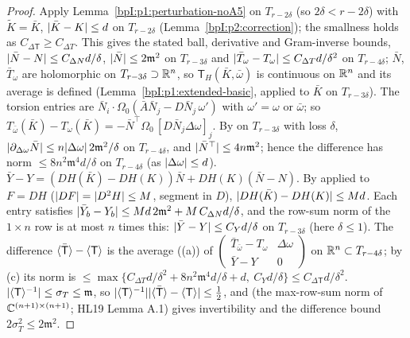 \begin{proof}
\label{stepI:p2:to-frame}
Apply Lemma~\ref{bpI:p1:perturbation-noA5} on $T_{r-2\delta}$ (so $2\delta<r-2\delta$) with $\tilde K=\bar K$, $\lvert \bar K-K\rvert\le d$ on $T_{r-2\delta}$ (Lemma~\ref{bpI:p2:correction}); the smallness holds as $C_{\Delta\mathsf T}\ge C_{\Delta T}$. This gives the stated ball, derivative and Gram-inverse bounds, $\lvert \bar N-N\rvert\le C_{\Delta N}d/\delta$, $\lvert \bar N\rvert\le2\mathfrak m^2$ on $T_{r-3\delta}$ and $\lvert \bar T_\omega-T_\omega\rvert\le C_{\Delta T}d/\delta^2$ on $T_{r-4\delta}$; $\bar N$, $\bar T_\omega$ are holomorphic on $T_{r-3\delta}\supset\mathbb{R}^n$, so $\mathsf T_H(\bar K,\bar\omega)$ is continuous on $\mathbb{R}^n$ and its average is defined (Lemma~\ref{bpI:p1:extended-basic}, applied to $\bar K$ on $T_{r-3\delta}$).
\label{stepI:p2:to-omega}
The torsion entries are $\bar N_i\cdot\Omega_0(\bar A\bar N_j-D\bar N_j\,\omega')$ with $\omega'=\omega$ or $\bar\omega$; so $T_{\bar\omega}(\bar K)-T_\omega(\bar K)=-\bar N^\top\Omega_0\,[D\bar N_j\Delta\omega]_j$. By  on $T_{r-3\delta}$ with loss $\delta$, $\lvert \partial_{\Delta\omega}\bar N\rvert\le n\lvert \Delta\omega\rvert\,2\mathfrak m^2/\delta$ on $T_{r-4\delta}$, and $\lvert \bar N^\top\rvert\le4n\mathfrak m^2$; hence the difference has norm $\le8n^2\mathfrak m^4d/\delta$ on $T_{r-4\delta}$ (as $\lvert \Delta\omega\rvert\le d$).
\label{stepI:p2:to-row}
$\bar Y-Y=(DH(\bar K)-DH(K))\bar N+DH(K)(\bar N-N)$. By  applied to $F=DH$ ($\lvert DF\rvert=\lvert D^2H\rvert\le M$, segment in $D$), $\lvert DH(\bar K)-DH(K)\rvert\le Md$. Each entry satisfies $\lvert \bar Y_b-Y_b\rvert\le Md\,2\mathfrak m^2+M\,C_{\Delta N}d/\delta$, and the row-sum norm of the $1\times n$ row is at most $n$ times this: $\lvert \bar Y-Y\rvert\le C_Yd/\delta$ on $T_{r-3\delta}$ (here $\delta\le1$).
\label{stepI:p2:to-avg}
The difference $\langle \bar{\mathsf T}\rangle-\langle \mathsf T\rangle$ is the average ((a)) of $\begin{pmatrix}\bar T_{\bar\omega}-T_\omega&\Delta\omega\\ \bar Y-Y&0\end{pmatrix}$ on $\mathbb{R}^n\subset T_{r-4\delta}$; by (c) its norm is $\le\max\{C_{\Delta T}d/\delta^2+8n^2\mathfrak m^4d/\delta+d,\ C_Yd/\delta\}\le C_{\Delta\mathsf T}d/\delta^2$.
\label{stepI:p2:to-inv}
$\lvert \langle \mathsf T\rangle^{-1}\rvert\le\sigma_T\le\mathfrak m$, so $\lvert \langle \mathsf T\rangle^{-1}\rvert\lvert \langle \bar{\mathsf T}\rangle-\langle \mathsf T\rangle\rvert\le\frac12$, and  (the max-row-sum norm of $\mathbb{C}^{(n+1)\times(n+1)}$; HL19 Lemma A.1) gives invertibility and the difference bound $2\sigma_T^2\le2\mathfrak m^2$.
\end{proof}

